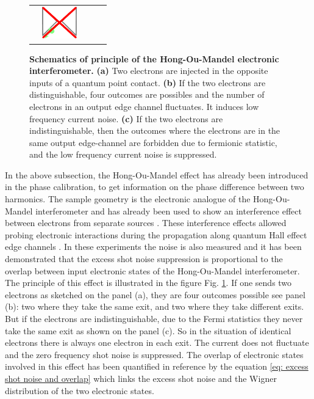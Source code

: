 \begin{figure}[hptb]
\begin{center}
\begin{tabular}{c c c c c}
			& \includegraphics[width = 1.5cm]{./chap1/dessin_HOM_c_3}
		\end{tabular} 
	\end{center}
	\caption{ \textbf{Schematics of principle of the Hong-Ou-Mandel electronic interferometer.} \textbf{(a)} Two electrons are injected in the opposite inputs of a quantum point contact. \textbf{(b)} If the two electrons are distinguishable, four outcomes are possibles and the number of electrons in an output edge channel fluctuates. It induces low frequency current noise. \textbf{(c)} If the two electrons are indistinguishable, then the outcomes where the electrons are in the same output edge-channel are forbidden due to fermionic statistic, and the low frequency current noise is suppressed.}
	\label{fig: HOM principle}
\end{figure}

In the above subsection, the Hong-Ou-Mandel effect has already been introduced in the phase calibration, to get information on the phase difference between two harmonics.
The sample geometry is the electronic analogue of the Hong-Ou-Mandel interferometer and has already been used to show an interference effect between electrons from separate sources \cite{bocquillon2013}.
These interference effects allowed probing electronic interactions during the propagation along quantum Hall effect edge channels \cite{freulon2015hong}.
In these experiments the noise is also measured and it has been demonstrated that the excess shot noise suppression is proportional to the overlap between input electronic states of the Hong-Ou-Mandel interferometer.
The principle of this effect is illustrated in the figure Fig. \ref{fig: HOM principle}.
If one sends two electrons as sketched on the panel (a), they are four outcomes possible see panel (b): two where they take the same exit, and two where they take different exits.
But if the electrons are indistinguishable, due to the Fermi statistics they never take the same exit as shown on the panel (c).
So in the situation of identical electrons there is always one electron in each exit.
The current does not fluctuate and the zero frequency shot noise is suppressed.
The overlap of electronic states involved in this effect has been quantified in reference \cite{marguerite2017two} by the equation \eqref{eq: excess shot noise and overlap} which links the excess shot noise and the Wigner distribution of the two electronic states.

